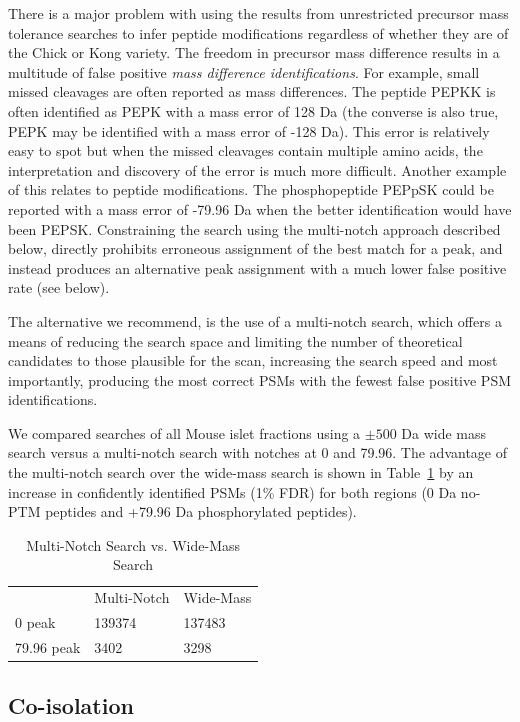 \documentclass[journal=jprobs,manuscript=article]{achemso}
\begin{document}
There is a major problem with using the results from unrestricted precursor mass tolerance searches to infer peptide modifications regardless of whether they are of the Chick or Kong variety.
The freedom in precursor mass difference results in a multitude of false positive \textit{mass difference identifications}.
For example, small missed cleavages are often reported as mass differences.
The peptide PEPKK is often identified as PEPK with a mass error of 128 Da (the converse is also true, PEPK may be identified with a mass error of -128 Da).
This error is relatively easy to spot but when the missed cleavages contain multiple amino acids, the interpretation and discovery of the error is much more difficult.
Another example of this relates to peptide modifications.
The phosphopeptide PEPpSK could be reported with a mass error of -79.96 Da when the better identification would have been PEPSK.
Constraining the search using the multi-notch approach described below, directly prohibits erroneous assignment of the best match for a peak, and instead produces an alternative peak assignment with a much lower false positive rate (see below).

The alternative we recommend, is the use of a multi-notch search, which offers a means of reducing the search space and limiting the number of theoretical candidates to those plausible for the scan, increasing the search speed and most importantly, producing the most correct PSMs with the fewest false positive PSM identifications.

We compared searches of all Mouse islet fractions using a $\pm 500$ Da wide mass search versus a multi-notch search with notches at 0 and 79.96.
The advantage of the multi-notch search over the wide-mass search is shown in Table~\ref{tbl:multiVsWide} by an increase in confidently identified PSMs (1\% FDR) for both regions (0 Da no-PTM peptides and +79.96 Da phosphorylated peptides).

\begin{table}[]
\centering
\caption{Multi-Notch Search vs. Wide-Mass Search}
\label{tbl:multiVsWide}
\begin{tabular}{lll}
                    & Multi-Notch & Wide-Mass\\
0 peak & 139374      & 137483        \\
79.96 peak & 3402           & 3298          \\
\end{tabular}
\end{table}

\subsection{Co-isolation}
\end{document}
